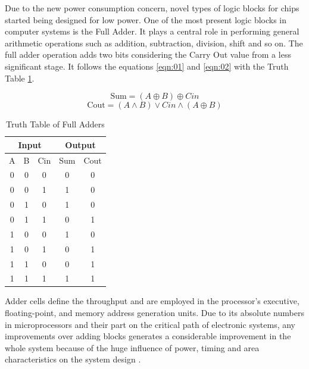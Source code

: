 \documentclass[ecp,tc, english]{iiufrgs}
\newcommand*\xor{\mathbin{\oplus}}
\begin{document}
Due to the new power consumption concern, novel types of logic blocks for chips started being designed for low power. One of the most present logic blocks in computer systems is the Full Adder. It plays a central role in performing general arithmetic operations such as addition, subtraction, division, shift and so on. The full adder operation adds two bits considering the Carry Out value from a less significant stage. It follows the equations \ref{eqn:01} and \ref{eqn:02} with the Truth Table \ref{tab:01}.

\begin{equation}
\label{eqn:01}
\text{Sum} = (A \xor{} B) \xor{} Cin
\end{equation}
\begin{equation}
\label{eqn:02}
\text{Cout} = (A \wedge B) \vee Cin \wedge (A \xor{} B)
\end{equation}

\begin{table}[H]
\centering
\caption{Truth Table of Full Adders}
\label{tab:01}
\begin{tabular}{|c|c|c|c|c|}
\hline
\multicolumn{3}{|c|}{Input} & \multicolumn{2}{c|}{Output} \\ \hline
A       & B      & Cin      & Sum          & Cout         \\ \hline
0       & 0      & 0        & 0            & 0            \\ \hline
0       & 0      & 1        & 1            & 0            \\ \hline
0       & 1      & 0        & 1            & 0            \\ \hline
0       & 1      & 1        & 0            & 1            \\ \hline
1       & 0      & 0        & 1            & 0            \\ \hline
1       & 0      & 1        & 0            & 1            \\ \hline
1       & 1      & 0        & 0            & 1            \\ \hline
1       & 1      & 1        & 1            & 1            \\ \hline
\end{tabular}
\end{table}

Adder cells define the throughput and are employed in the processor’s executive, floating-point, and memory address generation units. Due to its absolute numbers in microprocessors and their part on the critical path of electronic systems, any improvements over adding blocks generates a considerable improvement in the whole system because of the huge influence of power, timing and area characteristics on the system design \cite{shoarinejad:03}.
\end{document}
